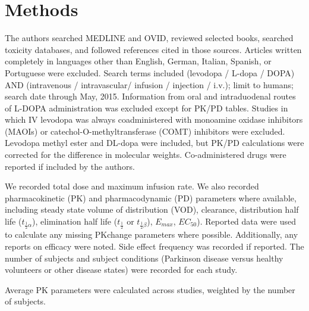 \section{Methods}
The authors searched MEDLINE and OVID, reviewed selected books, searched toxicity databases, and followed references cited in those sources. Articles written completely in languages other than English, German, Italian, Spanish, or Portuguese were excluded. Search terms included (levodopa / L-dopa / DOPA) AND (intravenous / intravascular/ infusion / injection / i.v.); limit to humans; search date through May, 2015. Information from oral and intraduodenal routes of L-DOPA administration was excluded except for PK/PD tables.  Studies in which IV levodopa was always coadministered with monoamine oxidase inhibitors (MAOIs) or catechol-O-methyltransferase (COMT) inhibitors were excluded.  Levodopa methyl ester \cite{3601092} and DL-dopa \cite{14430381} were included, but PK/PD calculations were corrected for the difference in molecular weights.  Co-administered drugs were reported if included by the authors.

We recorded total dose and maximum infusion rate.  We also recorded pharmacokinetic (PK) and pharmacodynamic (PD) parameters where available, including steady state volume of distribution (VOD), clearance, distribution half life ($t_{\frac{1}{2}\alpha}$), elimination half life ($t_{\frac{1}{2}}$ or $t_{\frac{1}{2}\beta}$), $E_{max}$, $EC_{50}$).   Reported data were used to calculate any missing PKchange parameters where possible.  Additionally, any reports on efficacy were noted.  Side effect frequency was recorded if reported. The number of subjects and subject conditions (Parkinson disease versus healthy volunteers or other disease states) were recorded for each study. 

Average PK parameters were calculated across studies, weighted by the number of subjects.